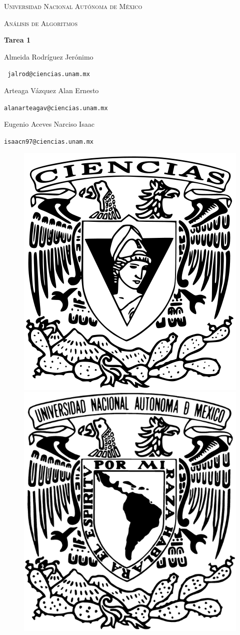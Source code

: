\documentclass[a4paper, 12pt]{report}
\begin{document}
\begin{titlepage}
    \centering
    {\scshape\Huge Universidad Nacional Autónoma de México \par}
    \vspace{1.5cm}
    {\scshape\huge Análisis de Algoritmos\par}
    \vspace{1.25cm}
    {\huge\bfseries Tarea 1\par}
    \vspace{1.5cm}
    {\Large\textsc Almeida Rodríguez Jerónimo\par}
    \vspace{.1cm}
    {\large\texttt{ jalrod@ciencias.unam.mx}\par}
    \vspace{0.5cm}
    {\Large\textsc Arteaga Vázquez Alan Ernesto\par}
    \vspace{.1cm}
    {\large\texttt{alanarteagav@ciencias.unam.mx}\par}
    \vspace{0.5cm}
    {\Large\textsc Eugenio Aceves Narciso Isaac \par}
    \vspace{.1cm}
    {\large\texttt{isaacn97@ciencias.unam.mx}\par}
    \vspace{2cm}
    \vfill
    \begin{figure}[hb!]
        \includegraphics[width=.3\textwidth]
            {../logos/escudo_f-ciencias.png}\hfill
        \includegraphics[width=.3\textwidth]
            {../logos/Escudo_UNAM.png}\hfill
    \end{figure}
\end{titlepage}
\end{document}
